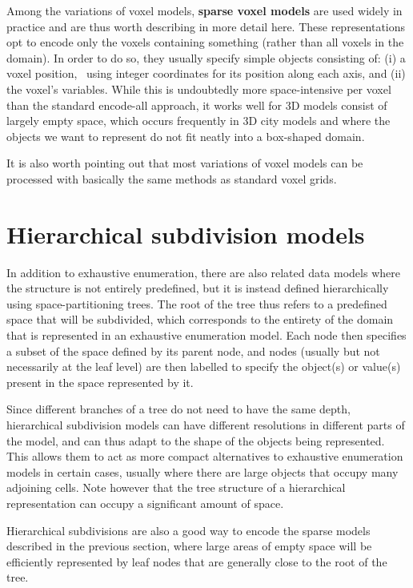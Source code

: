 Among the variations of voxel models, \textbf{sparse voxel models} are used widely in practice and are thus worth describing in more detail here.
These representations opt to encode only the voxels containing something (rather than all voxels in the domain).
In order to do so, they usually specify simple objects consisting of: (i) a voxel position, \eg\ using integer coordinates for its position along each axis, and (ii) the voxel's variables.
While this is undoubtedly more space-intensive per voxel than the standard encode-all approach, it works well for 3D models consist of largely empty space, which occurs frequently in 3D city models and where the objects we want to represent do not fit neatly into a box-shaped domain.

It is also worth pointing out that most variations of voxel models can be processed with basically the same methods as standard voxel grids.

\section{Hierarchical subdivision models}

In addition to exhaustive enumeration, there are also related data models where the structure is not entirely predefined, but it is instead defined hierarchically using space-partitioning trees.
The root of the tree thus refers to a predefined space that will be subdivided, which corresponds to the entirety of the domain that is represented in an exhaustive enumeration model.
Each node then specifies a subset of the space defined by its parent node, and nodes (usually but not necessarily at the leaf level) are then labelled to specify the object(s) or value(s) present in the space represented by it.

Since different branches of a tree do not need to have the same depth, hierarchical subdivision models can have different resolutions in different parts of the model, and can thus adapt to the shape of the objects being represented.
This allows them to act as more compact alternatives to exhaustive enumeration models in certain cases, usually where there are large objects that occupy many adjoining cells.
Note however that the tree structure of a hierarchical representation can occupy a significant amount of space.

Hierarchical subdivisions are also a good way to encode the sparse models described in the previous section, where large areas of empty space will be efficiently represented by leaf nodes that are generally close to the root of the tree.


